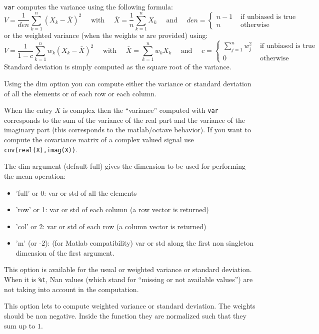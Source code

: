 \begin{mandescription}
  \verb+var+ computes the variance using the following formula:
$$
    V = \frac{1}{den} \sum_{k=1}^n (X_k - \bar{X})^2 \quad \mbox{  with  } \quad \bar{X} = \frac{1}{n} \sum_{k=1}^n X_k
   \quad \mbox{ and } \quad  den = \left\{ \begin{array}{cl}  n-1 & \mbox{ if unbiased is true}\\
                                                       n   & \mbox{ otherwise} \end{array}\right.
$$
or the weighted variance (when the weights $w$ are provided) using:
$$
    V = \frac{1}{1 - c} \sum_{k=1}^n w_k (X_k - \bar{X})^2 \quad \mbox{  with  } \quad \bar{X} =  \sum_{k=1}^n  w_k X_k
   \quad \mbox{ and } \quad  c = \left\{ \begin{array}{cl} \sum_{j=1}^n w_j^2  & \mbox{ if unbiased is true}\\
                                                       0   & \mbox{ otherwise} \end{array}\right.
$$
Standard deviation is simply computed as the square root of the variance.

Using the dim option you can compute either the variance or standard deviation
of all the elements or of each row or each column. 

When the entry $X$ is complex then the ``variance'' computed with \verb+var+ corresponds 
to the sum of the variance of the real part and the variance of the imaginary part (this 
corresponds to the matlab/octave behavior). If you want to compute the covariance matrix 
of a complex valued signal use \verb+cov(real(X),imag(X))+.

  The dim argument (default full) gives the dimension to be used for performing the mean operation:
  \begin{itemize}
    \item 'full' or 0: var or std of all the elements 
    \item 'row' or 1: var or std of each column (a row vector is returned)
    \item 'col' or 2: var or std of each row (a column vector is returned)
    \item 'm' (or -2): (for Matlab compatibility) var or std along the first non 
          singleton dimension of the first argument.
  \end{itemize}

   This option is available for the usual or weighted variance or standard deviation. 
When it is \verb+%t+,  Nan values (which stand for ``missing or not available values'') 
are not taking into account in the computation.
   
  This option lets to compute weighted variance or standard deviation. The weights should be non negative. Inside
the function they are normalized such that they sum up to $1$.
   
\end{mandescription}

